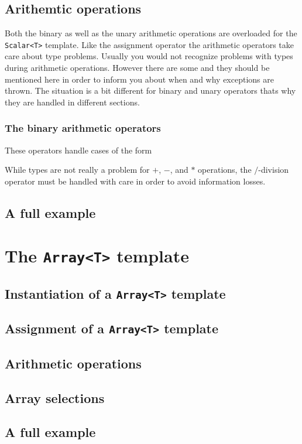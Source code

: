\subsection{Arithemtic operations}
Both the binary as well as the unary arithmetic operations are overloaded 
for the {\tt Scalar<T>} template. Like the assignment operator the arithmetic
operators take care about type problems. Usually you would not recognize
problems with types during arithmetic operations. However there are some 
and they should be mentioned here in order to inform you about when and why 
exceptions are thrown. The situation is a bit different for binary and unary 
operators thats why they are handled in different sections.

\subsubsection{The binary arithmetic operators}
These operators handle cases of the form



While types are not really a problem for $+$, $-$, and $*$ operations, the $/$-division operator must be handled with care in order to avoid information 
losses. 

\subsection{A full example}

\section{The {\tt Array<T>} template}

\subsection{Instantiation of a {\tt Array<T>} template}

\subsection{Assignment of a {\tt Array<T>} template}

\subsection{Arithmetic operations}

\subsection{Array selections}

\subsection{A full example}